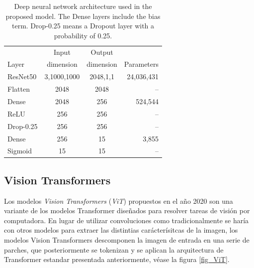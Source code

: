 {\begin{table}[!ht]
    \centering
    \begin{tabular}{| l|c | c | r |}
    \hline
                 &     Input   &  Output    &  \\
    Layer        &   dimension & dimension  & Parameters \\
    \hline\hline
    ResNet50     &     3,1000,1000 &     2048,1,1 & 24,036,431 \\
    Flatten      &     2048        &     2048     &  --        \\
    Dense        &     2048        &     256      & 524,544    \\
    ReLU         &     256         &     256      & --         \\
    Drop-0.25  &     256         &     256      & --         \\
    Dense        &     256         &     15       &  3,855     \\
    Sigmoid      &     15          &     15       & --         \\
    \hline
    \end{tabular}
    \caption{Deep neural network architecture used in the proposed model. The Dense layers include the bias term. Drop-0.25 means a Dropout layer with a probability of 0.25.}
    \label{table_resnet50}
\end{table}

\subsection{Vision Transformers}

Los modelos \textit{Vision Transformers} (\textit{ViT}) \cite{DBLP:journals/corr/abs-2010-11929} propuestos en el
año 2020 son una variante de los modelos Transformer diseñados para resolver tareas de visión por
computadora. En lugar de utilizar convoluciones como tradicionalmente se haría con otros modelos
para extraer las distintias carácterísitcas de la imagen, los modelos Vision Transformers descomponen
la imagen de entrada en una serie de parches, que posteriormente se tokenizan y se aplican la
arquitectura de Transformer estandar presentada anteriormente, véase la figura \ref{fig_ViT}.

}
